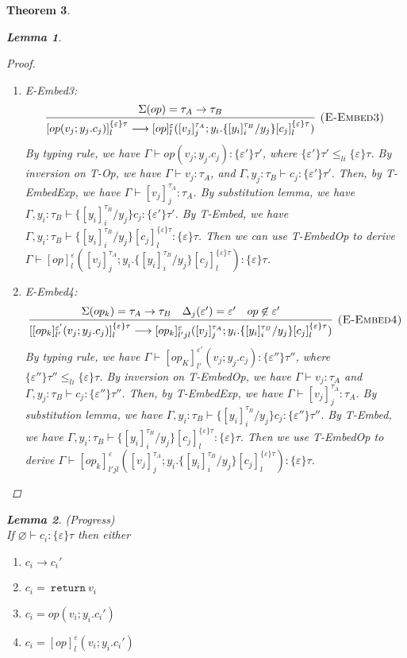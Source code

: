 \documentclass{article}
\newtheorem{theorem}{Theorem}[section]
\newtheorem{lemma}[theorem]{Lemma}
\newcommand{\m}[1]{\ \texttt{#1}\ }
\begin{document}
\begin{theorem}
\begin{lemma}
\begin{proof}
\begin{enumerate}
\item E-Embed3: 
$$
\infer[\textsc{(E-Embed3)}]
{[op(v_j; y_j.c_j)]^{\{\varepsilon\}\tau}_l \longrightarrow [op]^\varepsilon_l([v_j]^{\tau_A}_j; y_i. \{[y_i]^{\tau_B}_i / y_j\}[c_j]^{\{\varepsilon\}\tau}_l)}
{ \Sigma(op) = \tau_A \rightarrow \tau_B} 
$$
By typing rule, we have $\Gamma \vdash op(v_j; y_j.c_j) : \{\varepsilon'\}\tau'$, where $\{\varepsilon'\}\tau' \leq_{li} \{\varepsilon\}\tau$. By inversion on T-Op, we have $\Gamma \vdash v_j : \tau_A$, and $\Gamma, y_j : \tau_B \vdash c_j: \{\varepsilon'\}\tau'$. Then, by T-EmbedExp, we have $\Gamma \vdash [v_j]^{\tau_A}_j : \tau_A$. By substitution lemma, we have $\Gamma, y_i: \tau_B \vdash \{[y_i]^{\tau_B}_i/y_j\}c_j : \{\varepsilon'\}\tau'$. By T-Embed, we have $\Gamma, y_i: \tau_B \vdash \{[y_i]^{\tau_B}_i/y_j\}[c_j]^{\{\varepsilon\}\tau}_l : \{\varepsilon\}\tau$. Then we can use T-EmbedOp to derive $\Gamma \vdash [op]^\varepsilon_l([v_j]^{\tau_A}_j; y_i. \{[y_i]^{\tau_B}_i / y_j\}[c_j]^{\{\varepsilon\}\tau}_l): \{\varepsilon\}\tau$. 

\item E-Embed4:
$$
\infer[\textsc{(E-Embed4)}]
{[[op_k]^{\varepsilon'}_{l'}(v_j; y_j.c_j)]^{\{\varepsilon\}\tau}_l \longrightarrow [op_k]^\varepsilon_{l'jl}([v_j]^{\tau_A}_j; y_i. \{[y_i]^{\tau_B}_i / y_j\}[c_j]^{\{\varepsilon\}\tau}_l)}
{ \Sigma(op_k) = \tau_A \rightarrow \tau_B& \Delta_j(\varepsilon') = \varepsilon' & op \not \in \varepsilon'} 
$$
By typing rule, we have $\Gamma \vdash [op_K]^{\varepsilon'}_{l'}(v_j; y_j.c_j) : \{\varepsilon''\}\tau''$, where $\{\varepsilon''\}\tau'' \leq_{li} \{\varepsilon\}\tau$. By inversion on T-EmbedOp, we have $\Gamma \vdash v_j: \tau_A$ and $\Gamma, y_j : \tau_B \vdash c_j: \{\varepsilon''\}\tau''$. Then, by T-EmbedExp, we have $\Gamma \vdash [v_j]^{\tau_A}_j : \tau_A$.
By substitution lemma, we have $\Gamma, y_i: \tau_B \vdash \{[y_i]^{\tau_B}_i/y_j\}c_j : \{\varepsilon''\}\tau''$. By T-Embed, we have $\Gamma, y_i: \tau_B \vdash \{[y_i]^{\tau_B}_i/y_j\}[c_j]^{\{\varepsilon\}\tau}_l : \{\varepsilon\}\tau$. Then we use T-EmbedOp to derive $\Gamma \vdash [op_k]^\varepsilon_{l'jl}([v_j]^{\tau_A}_j; y_i. \{[y_i]^{\tau_B}_i / y_j\}[c_j]^{\{\varepsilon\}\tau}_l) : \{\varepsilon\}\tau$.
\end{enumerate}
\end{proof}
\end{lemma}

\begin{lemma} (Progress) \\
If $\varnothing \vdash c_i : \{\varepsilon\} \tau$ then either
\begin{enumerate}
\item  $c_i \longrightarrow c_i'$ 
\item  $c_i = \m{return} v_i$
\item $c_i = op(v_i; y_i.c_i')$
\item $c_i = [op]^\varepsilon_l(v_i; y_i.c_i')$
 \end{enumerate}
\end{lemma}

\end{theorem}
\end{document}
